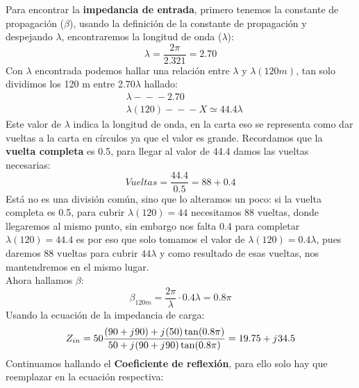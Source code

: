 \documentclass[
	12pt, %
	fleqn, %
	a4paper, %
	oneside, %
]{LegrandOrangeBook}
\begin{document}
\begin{example}[Una línea de transmisión sin pérdidas tiene una $Z_0=50\Omega$ y una constante de fase de 2.321 rad/m, si la longitud de línea es de 120m y opera a 90MHz con una impedancia de carga $Z_L=90+\iu 90$. Encontrar: Impedancia de entrada, coeficiente de reflexión, SWR, perdida por retorno y potencia relativa.]\label{exe:1}
Para encontrar la \textbf{impedancia de entrada}, primero tenemos la constante de propagación ($\beta$), usando la definición de la constante de propagación y despejando $\lambda$, encontraremos la longitud de onda ($\lambda$):
\begin{displaymath}
\lambda=\frac{2\pi}{2.321}=2.70
\end{displaymath}
Con $\lambda$ encontrada podemos hallar una relación entre $\lambda$ y $\lambda(120m)$, tan solo dividimos los 120 m entre 2.70$\lambda$ hallado:
\begin{align*}
& \lambda -\!\!\!-\!\!\!- 2.70\\
& \lambda(120) -\!\!\!-\!\!\!- X\simeq 44.4\lambda
\end{align*}
Este valor de $\lambda$ indica la longitud de onda, en la carta eso se representa como dar vueltas a la carta en círculos ya que el valor es grande. Recordamos que la \textbf{vuelta completa} es 0.5, para llegar al valor de 44.4 damos las vueltas necesarias:
\begin{displaymath}
Vueltas=\frac{44.4}{0.5}=88+0.4
\end{displaymath}
Está no es una división común, sino que lo alteramos un poco: si la vuelta completa es 0.5, para cubrir $\lambda(120)=44$ necesitamos 88 vueltas, donde llegaremos al mismo punto, sin embargo nos falta 0.4 para completar $\lambda(120)=44.4$ es por eso que solo tomamos el valor de $\lambda(120)=0.4\lambda$, pues daremos 88 vueltas para cubrir $44\lambda$ y como resultado de esas vueltas, nos mantendremos en el mismo lugar.\\
Ahora hallamos $\beta$:
\begin{displaymath}
\beta_{120m}=\frac{2\pi}{\lambda}\cdot 0.4\lambda=0.8\pi
\end{displaymath}
Usando la ecuación de la impedancia de carga:
\begin{displaymath}
Z_{in}=50\frac{(90+{j\mkern1mu} 90)+{j\mkern1mu}(50)\tan(0.8\pi)}{50+{j\mkern1mu}(90+{j\mkern1mu} 90)\tan(0.8\pi)}=19.75+{j\mkern1mu}34.5
\end{displaymath}
Continuamos hallando el \textbf{Coeficiente de reflexión}, para ello solo hay que reemplazar en la ecuación respectiva:
\begin{displaymath}

\end{displaymath}
\end{example}
\end{document}
